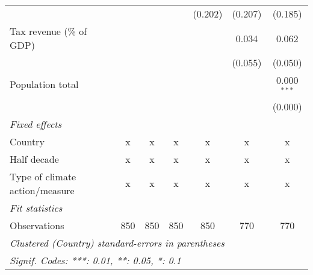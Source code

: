 \begin{tabular}{lcccccc}
                                               &               &               &               & (0.202)        & (0.207)        & (0.185)\\   
   Tax revenue (\% of GDP)                     &               &               &               &                & 0.034          & 0.062\\   
                                               &               &               &               &                & (0.055)        & (0.050)\\   
   Population total                            &               &               &               &                &                & 0.000$^{***}$\\   
                                               &               &               &               &                &                & (0.000)\\   
   \emph{Fixed effects}\\
   Country                                     & x             & x             & x             & x              & x              & x\\  
   Half decade                                 & x             & x             & x             & x              & x              & x\\  
   Type of climate action/measure              & x             & x             & x             & x              & x              & x\\  
   \midrule \emph{Fit statistics}\\
   Observations                                & 850           & 850           & 850           & 850            & 770            & 770\\  
   \midrule
   \multicolumn{7}{l}{\emph{Clustered (Country) standard-errors in parentheses}}\\
   \multicolumn{7}{l}{\emph{Signif. Codes: ***: 0.01, **: 0.05, *: 0.1}}\\
\end{tabular}
\par\endgroup


